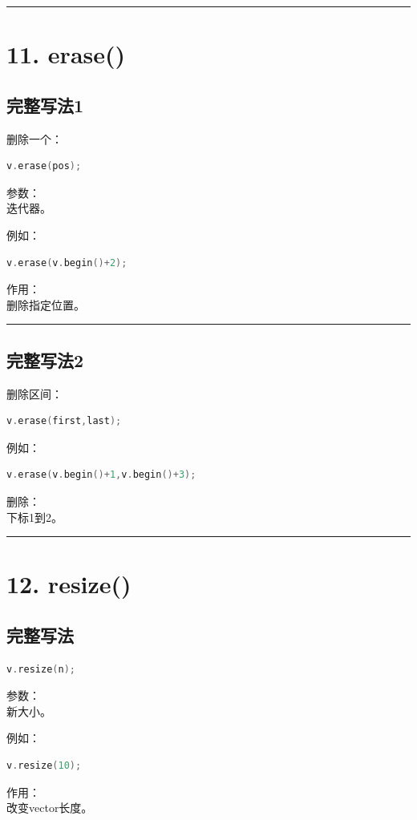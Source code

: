 \documentclass[10pt,twocolumn]{extarticle}
\begin{document}
\noindent\rule{\linewidth}{0.4pt}

\section{11. erase()}

\subsection{完整写法1}
删除一个：
\begin{lstlisting}[language=C++]
v.erase(pos);
\end{lstlisting}
参数：\\
迭代器。

例如：
\begin{lstlisting}[language=C++]
v.erase(v.begin()+2);
\end{lstlisting}
作用：\\
删除指定位置。

\noindent\rule{\linewidth}{0.4pt}

\subsection{完整写法2}
删除区间：
\begin{lstlisting}[language=C++]
v.erase(first,last);
\end{lstlisting}
例如：
\begin{lstlisting}[language=C++]
v.erase(v.begin()+1,v.begin()+3);
\end{lstlisting}
删除：\\
下标1到2。

\noindent\rule{\linewidth}{0.4pt}

\section{12. resize()}

\subsection{完整写法}
\begin{lstlisting}[language=C++]
v.resize(n);
\end{lstlisting}
参数：\\
新大小。

例如：
\begin{lstlisting}[language=C++]
v.resize(10);
\end{lstlisting}
作用：\\
改变vector长度。
\end{document}
